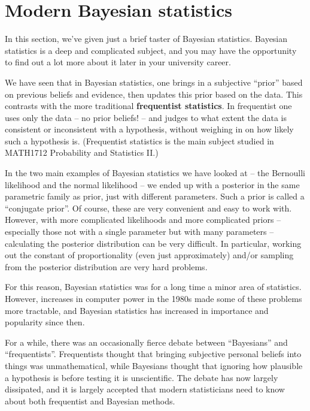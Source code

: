 \documentclass[
  letterpaper,
  DIV=11,
  numbers=noendperiod]{scrreprt}
\theoremstyle{remark}
\begin{document}
\hypertarget{modern-bayes}{%
\section{Modern Bayesian statistics}\label{modern-bayes}}

In this section, we've given just a brief taster of Bayesian statistics.
Bayesian statistics is a deep and complicated subject, and you may have
the opportunity to find out a lot more about it later in your university
career.

We have seen that in Bayesian statistics, one brings in a subjective
``prior'' based on previous beliefs and evidence, then updates this
prior based on the data. This contrasts with the more traditional
\textbf{frequentist statistics}. In frequentist one uses only the data
-- no prior beliefs! -- and judges to what extent the data is consistent
or inconsistent with a hypothesis, without weighing in on how likely
such a hypothesis is. (Frequentist statistics is the main subject
studied in MATH1712 Probability and Statistics II.)

In the two main examples of Bayesian statistics we have looked at -- the
Bernoulli likelihood and the normal likelihood -- we ended up with a
posterior in the same parametric family as prior, just with different
parameters. Such a prior is called a ``conjugate prior''. Of course,
these are very convenient and easy to work with. However, with more
complicated likelihoods and more complicated priors -- especially those
not with a single parameter but with many parameters -- calculating the
posterior distribution can be very difficult. In particular, working out
the constant of proportionality (even just approximately) and/or
sampling from the posterior distribution are very hard problems.

For this reason, Bayesian statistics was for a long time a minor area of
statistics. However, increases in computer power in the 1980s made some
of these problems more tractable, and Bayesian statistics has increased
in importance and popularity since then.

For a while, there was an occasionally fierce debate between
``Bayesians'' and ``frequentists''. Frequentists thought that bringing
subjective personal beliefs into things was unmathematical, while
Bayesians thought that ignoring how plausible a hypothesis is before
testing it is unscientific. The debate has now largely dissipated, and
it is largely accepted that modern statisticians need to know about both
frequentist and Bayesian methods.
\end{document}
